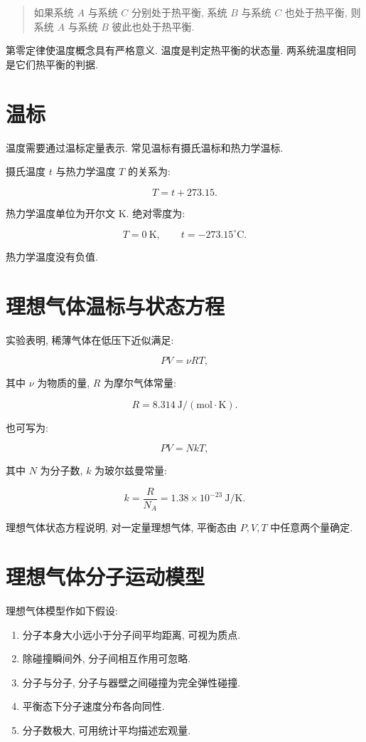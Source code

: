 \documentclass[
  a4paper,
]{ctexrep}
\providecommand{\tightlist}{%
  \setlength{\itemsep}{0pt}\setlength{\parskip}{0pt}}
\begin{document}
\begin{quote}
如果系统 \(A\) 与系统 \(C\) 分别处于热平衡, 系统 \(B\) 与系统 \(C\)
也处于热平衡, 则系统 \(A\) 与系统 \(B\) 彼此也处于热平衡.
\end{quote}

第零定律使温度概念具有严格意义. 温度是判定热平衡的状态量.
两系统温度相同是它们热平衡的判据.

\section{温标}\label{ux6e29ux6807}

温度需要通过温标定量表示. 常见温标有摄氏温标和热力学温标.

摄氏温度 \(t\) 与热力学温度 \(T\) 的关系为:

\[
T=t+273.15.
\]

热力学温度单位为开尔文 \(\mathrm{K}\). 绝对零度为:

\[
T=0\ \mathrm{K},\qquad t=-273.15^\circ\mathrm{C}.
\]

热力学温度没有负值.

\section{理想气体温标与状态方程}\label{ux7406ux60f3ux6c14ux4f53ux6e29ux6807ux4e0eux72b6ux6001ux65b9ux7a0b}

实验表明, 稀薄气体在低压下近似满足:

\[
PV=\nu RT,
\]

其中 \(\nu\) 为物质的量, \(R\) 为摩尔气体常量:

\[
R=8.314\ \mathrm{J/(mol\cdot K)}.
\]

也可写为:

\[
PV=NkT,
\]

其中 \(N\) 为分子数, \(k\) 为玻尔兹曼常量:

\[
k=\frac{R}{N_A}=1.38\times 10^{-23}\ \mathrm{J/K}.
\]

理想气体状态方程说明, 对一定量理想气体, 平衡态由 \(P,V,T\)
中任意两个量确定.

\section{理想气体分子运动模型}\label{ux7406ux60f3ux6c14ux4f53ux5206ux5b50ux8fd0ux52a8ux6a21ux578b}

理想气体模型作如下假设:

\begin{enumerate}
\def\labelenumi{\arabic{enumi}.}
\tightlist
\item
  分子本身大小远小于分子间平均距离, 可视为质点.
\item
  除碰撞瞬间外, 分子间相互作用可忽略.
\item
  分子与分子, 分子与器壁之间碰撞为完全弹性碰撞.
\item
  平衡态下分子速度分布各向同性.
\item
  分子数极大, 可用统计平均描述宏观量.
\end{enumerate}
\end{document}
